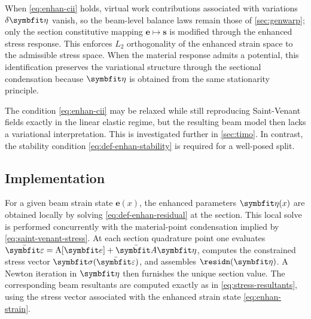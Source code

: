 When \eqref{eq:enhan-cii} holds, virtual work contributions associated with variations $\delta\bm{\EnhanParam}$ vanish, so the beam-level balance laws remain those of \cref{sec:genwarp}; only the section constitutive mapping $\bm{e}\mapsto \bm{s}$ is modified through the enhanced stress response.
This enforces $L_2$ orthogonality of the enhanced strain space to the admissible stress space. 
When the material response admits a potential, this identification preserves the variational structure through the sectional condensation because $\bm{\EnhanParam}$ is obtained from the same stationarity principle. 

The condition \eqref{eq:enhan-cii} may be relaxed while still reproducing Saint-Venant fields exactly in the linear elastic regime, but the resulting beam model then lacks a variational interpretation. This is investigated further in \cref{sec:timo}. 
In contrast, the stability condition \eqref{eq:def-enhan-stability} is required for a well-posed split. 

\subsection{Implementation}

For a given beam strain state $\bm{e}(x)$, the enhanced parameters $\bm{\EnhanParam}(x)$ are obtained locally by solving \eqref{eq:def-enhan-residual} at the section. 
This local solve is performed concurrently with the material-point condensation implied by \eqref{eq:saint-venant-stress}. 
At each section quadrature point one evaluates $\bar{\bm\varepsilon}=\operatorname{A}[\bm{e}]+\EnhanShapes\bm{\EnhanParam}$, computes the constrained stress vector $\StressVector(\bar{\bm\varepsilon})$, and assembles $\residn(\bm{\EnhanParam})$. 
A Newton iteration in $\bm{\EnhanParam}$ then furnishes the unique section value. 
The corresponding beam resultants are computed exactly as in \eqref{eq:stress-resultants}, using the stress vector associated with the enhanced strain state \eqref{eq:enhan-strain}.


